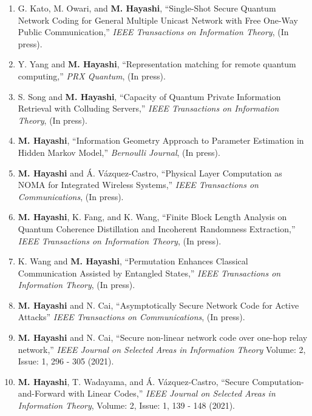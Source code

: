 \documentclass[a4paper,12pt,oneside]{article}
\begin{document}
\begin{enumerate}
\item  
G. Kato, M. Owari, and \textbf{M. Hayashi},
``Single-Shot Secure Quantum Network Coding for General Multiple Unicast Network with Free One-Way Public Communication,''
{\em IEEE Transactions on Information Theory}, 
(In press).

\item  
Y. Yang and \textbf{M. Hayashi},
``Representation matching for remote quantum computing,''
{\em PRX Quantum},
(In press).

\item  
S. Song and \textbf{M. Hayashi},
``Capacity of Quantum Private Information Retrieval with Colluding Servers,''
{\em IEEE Transactions on Information Theory}, 
(In press).

\item  
\textbf{M. Hayashi},
``Information Geometry Approach to Parameter Estimation in Hidden Markov Model,''
{\em Bernoulli Journal},
(In press).

\item  
\textbf{M. Hayashi} and \'{A}. V\'{a}zquez-Castro,
``Physical Layer Computation as NOMA for Integrated Wireless Systems,''
{\em IEEE Transactions on Communications},
(In press).

\item  
\textbf{M. Hayashi}, K. Fang, and K. Wang,
``Finite Block Length Analysis on Quantum Coherence Distillation and Incoherent Randomness Extraction,''
{\em IEEE Transactions on Information Theory},
(In press).

\item  
K. Wang and \textbf{M. Hayashi},
``Permutation Enhances Classical Communication Assisted by Entangled States,''
{\em IEEE Transactions on Information Theory},
(In press).

\item  
\textbf{M. Hayashi} and N. Cai,
``Asymptotically Secure Network Code for Active Attacks''
{\em IEEE Transactions on Communications},
(In press).

\item  
\textbf{M. Hayashi} and N. Cai,
``Secure non-linear network code over one-hop relay network,''
{\em IEEE Journal on Selected Areas in Information Theory}
Volume: 2, Issue: 1, 296 - 305 (2021).

\item  
\textbf{M. Hayashi}, T. Wadayama, and \'{A}. V\'{a}zquez-Castro,
``Secure Computation-and-Forward with Linear Codes,''
{\em IEEE Journal on Selected Areas in Information Theory},
Volume: 2, Issue: 1, 139 - 148 (2021).


\end{enumerate}
\end{document}
